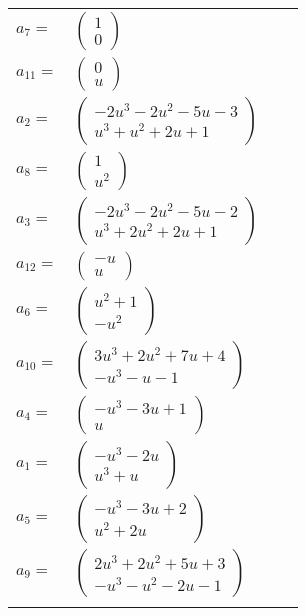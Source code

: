 \documentclass[1p]{elsarticle_modified}
\theoremstyle{definition}
\begin{document}
\begin{tabular}{m{7pt} m{180pt} m{7pt} m{180pt} }
\flushright $a_{7}=$&$\begin{pmatrix}1\\0\end{pmatrix}$ \\
\flushright $a_{11}=$&$\begin{pmatrix}0\\u\end{pmatrix}$ \\
\flushright $a_{2}=$&$\begin{pmatrix}-2 u^3-2 u^2-5 u-3\\u^3+u^2+2 u+1\end{pmatrix}$ \\
\flushright $a_{8}=$&$\begin{pmatrix}1\\u^2\end{pmatrix}$ \\
\flushright $a_{3}=$&$\begin{pmatrix}-2 u^3-2 u^2-5 u-2\\u^3+2 u^2+2 u+1\end{pmatrix}$ \\
\flushright $a_{12}=$&$\begin{pmatrix}- u\\u\end{pmatrix}$ \\
\flushright $a_{6}=$&$\begin{pmatrix}u^2+1\\- u^2\end{pmatrix}$ \\
\flushright $a_{10}=$&$\begin{pmatrix}3 u^3+2 u^2+7 u+4\\- u^3- u-1\end{pmatrix}$ \\
\flushright $a_{4}=$&$\begin{pmatrix}- u^3-3 u+1\\u\end{pmatrix}$ \\
\flushright $a_{1}=$&$\begin{pmatrix}- u^3-2 u\\u^3+u\end{pmatrix}$ \\
\flushright $a_{5}=$&$\begin{pmatrix}- u^3-3 u+2\\u^2+2 u\end{pmatrix}$ \\
\flushright $a_{9}=$&$\begin{pmatrix}2 u^3+2 u^2+5 u+3\\- u^3- u^2-2 u-1\end{pmatrix}$\\&\end{tabular}
\end{document}
